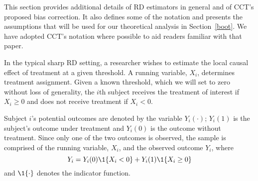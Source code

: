 \documentclass[12pt,fleqn]{article}
\begin{document}
This section provides additional details of RD estimators in general and of
CCT's proposed bias correction. It also defines some of the notation and
presents the assumptions that will be used for our theoretical analysis in
Section~\ref{boot}. We have adopted CCT's notation where possible to aid
readers familiar with that paper.

In the typical sharp RD setting, a researcher wishes to estimate the local
causal effect of treatment at a given threshold. A running variable, $X_{i}$,
determines treatment assignment.  Given a known threshold, which we
will set to zero without loss of generality, the $i$th subject receives the
treatment of interest if $X_{i} \geq 0$ and does not receive treatment if
$X_{i} < 0$.

Subject $i$'s potential outcomes are denoted by the variable $Y_i(\cdot)$;
$Y_i(1)$ is the subject's outcome under treatment and $Y_i(0)$
is the outcome without treatment. Since only one of the two
outcomes is observed, the sample is comprised of the running variable, $X_{i}$,
and the observed outcome $Y_i$, where
\begin{equation*}
  Y_{i}=Y_{i}(0) \1\{X_{i}<0\}+Y_{i}(1) \1\{X_{i} \geq 0\}
\end{equation*}
and $\1\{ \cdot\}$ denotes the indicator function.
\end{document}
